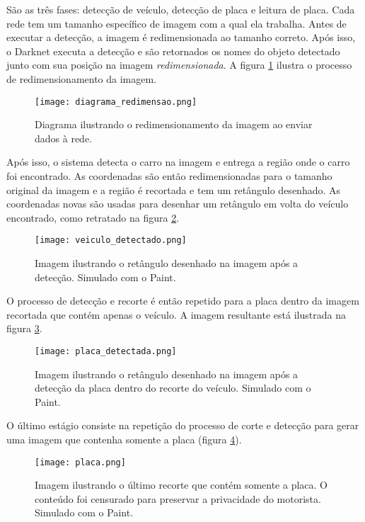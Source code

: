 \documentclass[conference]{IEEEtran}
\begin{document}
São as três fases: detecção de veículo, detecção de placa e leitura de placa.
Cada rede tem um tamanho específico de imagem com a qual ela trabalha.
Antes de executar a detecção, a imagem é redimensionada ao tamanho correto.
Após isso, o Darknet executa a detecção e são retornados os nomes do objeto detectado junto com sua posição na imagem \emph{redimensionada}.
A figura \ref{fig:diagrama_redimensao} ilustra o processo de redimensionamento da imagem.

\begin{figure}
    \centering
    \texttt{[image: diagrama\_redimensao.png]}
    \caption{Diagrama ilustrando o redimensionamento da imagem ao enviar dados à rede.}
    \label{fig:diagrama_redimensao}
\end{figure}

Após isso, o sistema detecta o carro na imagem e entrega a região onde o carro foi encontrado. As coordenadas são então redimensionadas para o tamanho original da imagem e a região é recortada e tem um retângulo desenhado.
As coordenadas novas são usadas para desenhar um retângulo em volta do veículo encontrado, como retratado na figura \ref{fig:veiculo_detectado}.

\begin{figure}
    \centering
    \texttt{[image: veiculo\_detectado.png]}
    \caption{Imagem ilustrando o retângulo desenhado na imagem após a detecção. Simulado com o Paint.}
    \label{fig:veiculo_detectado}
\end{figure}

O processo de detecção e recorte é então repetido para a placa dentro da imagem recortada que contém apenas o veículo.
A imagem resultante está ilustrada na figura \ref{fig:placa_detectada}.

\begin{figure}
    \centering
    \texttt{[image: placa\_detectada.png]}
    \caption{Imagem ilustrando o retângulo desenhado na imagem após a detecção da placa dentro do recorte do veículo. Simulado com o Paint.}
    \label{fig:placa_detectada}
\end{figure}

O último estágio consiste na repetição do processo de corte e detecção para gerar uma imagem que contenha somente a placa (figura \ref{fig:placa_recorte}).

\begin{figure}
    \centering
    \texttt{[image: placa.png]}
    \caption{Imagem ilustrando o último recorte que contém somente a placa. O conteúdo foi censurado para preservar a privacidade do motorista. Simulado com o Paint.}
    \label{fig:placa_recorte}
\end{figure}
\end{document}
